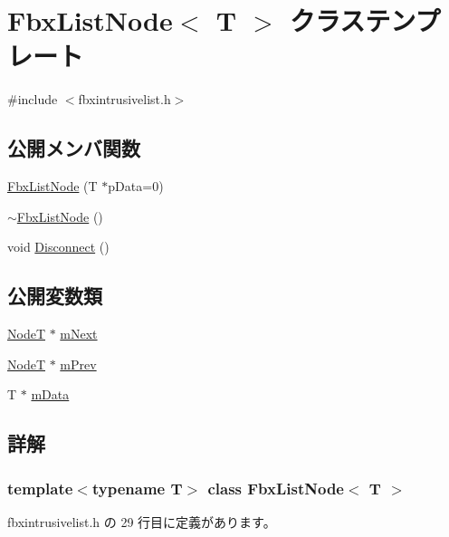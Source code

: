 \hypertarget{class_fbx_list_node}{}\section{Fbx\+List\+Node$<$ T $>$ クラステンプレート}
\label{class_fbx_list_node}


{\ttfamily \#include $<$fbxintrusivelist.\+h$>$}

\subsection*{公開メンバ関数}
\begin{DoxyCompactItemize}
\item 
\hyperlink{class_fbx_list_node_a785e2c232e0ed056e7a028d799fd0598}{Fbx\+List\+Node} (T $\ast$p\+Data=0)
\item 
\hyperlink{class_fbx_list_node_aab6a6fce53b6e3928489c2a9eb91d7ff}{$\sim$\+Fbx\+List\+Node} ()
\item 
void \hyperlink{class_fbx_list_node_a8efc990a61791021842291e449c0c6df}{Disconnect} ()
\end{DoxyCompactItemize}
\subsection*{公開変数類}
\begin{DoxyCompactItemize}
\item 
\hyperlink{class_fbx_list_node}{NodeT} $\ast$ \hyperlink{class_fbx_list_node_ab2222766332e5adf83e11f3837258193}{m\+Next}
\item 
\hyperlink{class_fbx_list_node}{NodeT} $\ast$ \hyperlink{class_fbx_list_node_ac384122a2dbb52a949646b26db8b59fc}{m\+Prev}
\item 
T $\ast$ \hyperlink{class_fbx_list_node_a4cf8e0064fee22cafa5a3a8330777c57}{m\+Data}
\end{DoxyCompactItemize}


\subsection{詳解}
\subsubsection*{template$<$typename T$>$\newline
class Fbx\+List\+Node$<$ T $>$}



 fbxintrusivelist.\+h の 29 行目に定義があります。



